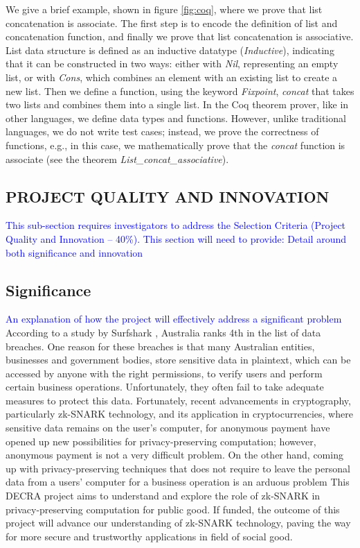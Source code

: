 \documentclass[12pt,a4paper]{article}
\newcommand{\rules}[1]{\textcolor{blue}{#1}}
\newcommand*{\TitleFont}{%
      \usefont{\encodingdefault}{\rmdefault}{b}{n}%
      \fontsize{12}{12}%
      \selectfont}
\begin{document}
We give a brief example, shown in figure \ref{fig:coq}, where we prove that list concatenation is associate. 
The first step is to encode the definition of list and concatenation function, 
and finally we prove that list concatenation is associative. 
List data structure is defined as an inductive datatype (\textit{Inductive}), 
indicating that it can be constructed in two ways: either with 
\textit{Nil}, representing an empty list, or with \textit{Cons}, 
which combines an element with an existing list to create a new list.
Then we define a function, using the keyword \textit{Fixpoint}, 
\textit{concat} that takes two lists and combines them into a single list. 
In the Coq theorem prover, like in other languages, we define data types and functions. 
However, unlike traditional languages, we do not write test cases; instead, 
we prove the correctness of functions, e.g., in this case, 
we mathematically prove that the \textit{concat} function 
is associate (see the theorem \textit{List\_concat\_associative}).




\subsection*{\TitleFont PROJECT QUALITY AND INNOVATION}
\rules{This sub-section requires investigators to address the Selection Criteria 
(Project Quality and Innovation – 40\%). This section will need to provide: 
Detail around both significance and innovation}

\subsection*{Significance}
\rules{An explanation of how the project will effectively address a significant problem}
According to a study by Surfshark \cite{surfshark}, Australia ranks 4th in the list of data breaches. 
One reason for these breaches is that many Australian entities, businesses 
and government bodies, store sensitive data in plaintext, which can be accessed by 
anyone with the right permissions, to verify users and perform certain business 
operations. Unfortunately, they often fail to take adequate measures to protect 
this data. Fortunately, recent advancements in cryptography, particularly zk-SNARK technology, 
and its application in cryptocurrencies, where sensitive data remains on the user's 
computer, for anonymous payment have opened up new possibilities for privacy-preserving computation;
however, anonymous payment is not a very difficult problem.
On the other hand, coming up with privacy-preserving techniques that does 
not require to leave the personal data from a users' computer for a business operation 
is an arduous problem This DECRA project aims to understand and explore the 
role of zk-SNARK in privacy-preserving computation for public good. 
If funded, the outcome of this project will advance our understanding 
of zk-SNARK technology, paving the way for more secure and trustworthy 
applications in field of social good.
\end{document}
